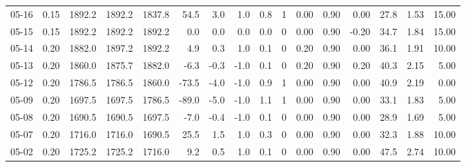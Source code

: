 \begin{threeparttable}
{\begin{tabular}{lrrrrrrrrrrrrrrr}
  05-16 &     0.15 & 1892.2 & 1892.2 & 1837.8 &       54.5 &            3.0 &                      1.0 &                 0.8 &              1 &       0.00 &      0.90 &           0.00 &             27.8 &            1.53 &                  15.00 \\
  05-15 &     0.15 & 1892.2 & 1892.2 & 1892.2 &        0.0 &            0.0 &                      0.0 &                 0.0 &              0 &       0.00 &      0.90 &          -0.20 &             34.7 &            1.84 &                  15.00 \\
  05-14 &     0.20 & 1882.0 & 1897.2 & 1892.2 &        4.9 &            0.3 &                      1.0 &                 0.1 &              0 &       0.20 &      0.90 &           0.00 &             36.1 &            1.91 &                  10.00 \\
  05-13 &     0.20 & 1860.0 & 1875.7 & 1882.0 &       -6.3 &           -0.3 &                     -1.0 &                 0.1 &              0 &       0.20 &      0.90 &           0.20 &             40.3 &            2.15 &                   5.00 \\
  05-12 &     0.20 & 1786.5 & 1786.5 & 1860.0 &      -73.5 &           -4.0 &                     -1.0 &                 0.9 &              1 &       0.00 &      0.90 &           0.00 &             40.9 &            2.19 &                   0.00 \\
  05-09 &     0.20 & 1697.5 & 1697.5 & 1786.5 &      -89.0 &           -5.0 &                     -1.0 &                 1.1 &              1 &       0.00 &      0.90 &           0.00 &             33.1 &            1.83 &                   5.00 \\
  05-08 &     0.20 & 1690.5 & 1690.5 & 1697.5 &       -7.0 &           -0.4 &                     -1.0 &                 0.1 &              0 &       0.00 &      0.90 &           0.00 &             28.9 &            1.69 &                   5.00 \\
  05-07 &     0.20 & 1716.0 & 1716.0 & 1690.5 &       25.5 &            1.5 &                      1.0 &                 0.3 &              0 &       0.00 &      0.90 &           0.00 &             32.3 &            1.88 &                  10.00 \\
  05-02 &     0.20 & 1725.2 & 1725.2 & 1716.0 &        9.2 &            0.5 &                      1.0 &                 0.1 &              0 &       0.00 &      0.90 &           0.00 &             47.5 &            2.74 &                  10.00 \\

\end{tabular}}
\end{threeparttable}

